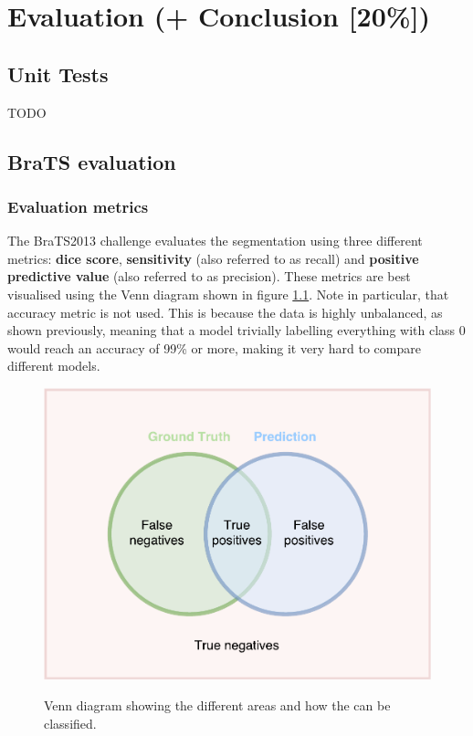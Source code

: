 \documentclass[12pt,a4paper,twoside,openright]{report}
\begin{document}
\chapter{Evaluation (+ Conclusion [20\%])}

\section{Unit Tests}
TODO

\section{BraTS evaluation}
\subsection{Evaluation metrics}
The BraTS2013 challenge \cite{brats-proceedings} evaluates the segmentation using three different metrics: \textbf{dice score}, \textbf{sensitivity} (also referred to as recall) and \textbf{positive predictive value} (also referred to as precision). These metrics are best visualised using the Venn diagram shown in figure \ref{fig:evaluation_venn_diagram}.  Note in particular, that accuracy metric is not used. This is because the data is highly unbalanced, as shown previously, meaning that a model trivially labelling everything with class 0 would reach an accuracy of 99\% or more, making it very hard to compare different models.

\begin{figure}
	\centering
	\includegraphics[scale = 0.5]{evaluation_venn_diagram}
	\label{fig:evaluation_venn_diagram}
	\caption{Venn diagram showing the different areas and how the can be classified.}
\end{figure}
\end{document}

